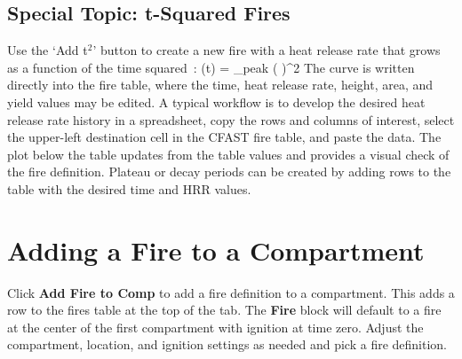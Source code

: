 {{\subsection{Special Topic: t-Squared Fires}
\label{tsq}

Use the `Add t$^2$' button to create a new fire with a heat release rate that grows as a function of the time squared~\cite{Schifiliti:2002}:
\be
\dQ(t) = \dQ_{\rm peak} \; \left(  \right)^2
\ee
The curve is written directly into the fire table, where the time, heat release rate, height, area, and yield values may be edited. A typical workflow is to develop the desired heat release rate history in a spreadsheet, copy the rows and columns of interest, select the upper-left destination cell in the CFAST fire table, and paste the data. The plot below the table updates from the table values and provides a visual check of the fire definition. Plateau or decay periods can be created by adding rows to the table with the desired time and HRR values.

\section{Adding a Fire to a Compartment}
\label{info:FIRE}

Click \textbf{Add Fire to Comp} to add a fire definition to a compartment. This adds a row to the fires table at the top of the tab. The \textbf{Fire} block will default to a fire at the center of the first compartment with ignition at time zero. Adjust the compartment, location, and ignition settings as needed and pick a fire definition.

}}
